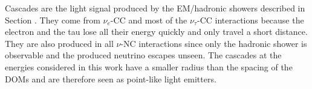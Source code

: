Cascades are the light signal produced by the EM/hadronic showers described in Section .
They come from $\nu_e$-CC and most of the $\nu_\tau$-CC interactions because the electron and the tau lose all their energy quickly and only travel a short distance.
They are also produced in all $\nu$-NC interactions since only the hadronic shower is observable and the produced neutrino escapes unseen.
The cascades at the energies considered in this work have a smaller radius than the spacing of the DOMs and are therefore seen as point-like light emitters.

